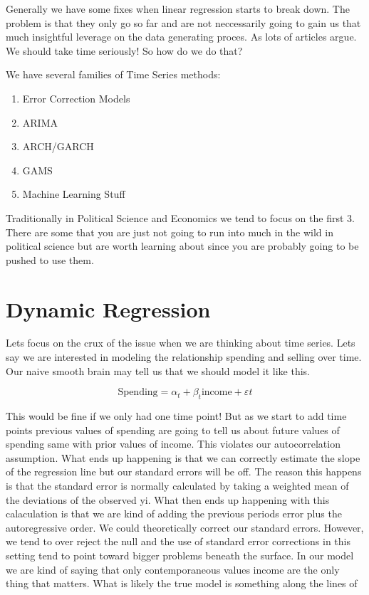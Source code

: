 \documentclass[
  letterpaper,
  DIV=11,
  numbers=noendperiod]{scrreprt}
\providecommand{\tightlist}{%
  \setlength{\itemsep}{0pt}\setlength{\parskip}{0pt}}\usepackage{longtable,booktabs,array}
\begin{document}
Generally we have some fixes when linear regression starts to break
down. The problem is that they only go so far and are not neccessarily
going to gain us that much insightful leverage on the data generating
proces. As lots of articles argue. We should take time seriously! So how
do we do that?

We have several families of Time Series methods:

\begin{enumerate}
\def\labelenumi{\arabic{enumi}.}
\tightlist
\item
  Error Correction Models
\item
  ARIMA
\item
  ARCH/GARCH
\item
  GAMS
\item
  Machine Learning Stuff
\end{enumerate}

Traditionally in Political Science and Economics we tend to focus on the
first 3. There are some that you are just not going to run into much in
the wild in political science but are worth learning about since you are
probably going to be pushed to use them.

\section{Dynamic Regression}\label{dynamic-regression}

Lets focus on the crux of the issue when we are thinking about time
series. Lets say we are interested in modeling the relationship spending
and selling over time. Our naive smooth brain may tell us that we should
model it like this.

\[
\text{Spending} = \alpha_{t} + \beta_{t} \text{income} + \varepsilon{t}
\]

This would be fine if we only had one time point! But as we start to add
time points previous values of spending are going to tell us about
future values of spending same with prior values of income. This
violates our autocorrelation assumption. What ends up happening is that
we can correctly estimate the slope of the regression line but our
standard errors will be off. The reason this happens is that the
standard error is normally calculated by taking a weighted mean of the
deviations of the observed yi. What then ends up happening with this
calaculation is that we are kind of adding the previous periods error
plus the autoregressive order. We could theoretically correct our
standard errors. However, we tend to over reject the null and the use of
standard error corrections in this setting tend to point toward bigger
problems beneath the surface. In our model we are kind of saying that
only contemporaneous values income are the only thing that matters. What
is likely the true model is something along the lines of
\end{document}
